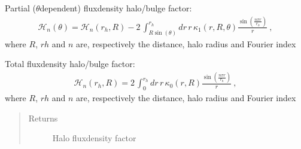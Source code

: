 \documentclass[letterpaper,10pt,english]{sphinxmanual}
\begin{document}

\begin{fulllineitems}
\label{\detokenize{diffsph.utils:diffsph.utils.tools.halo_fd}}
\sphinxAtStartPar
Partial (\(\theta\)\sphinxhyphen{}dependent) flux\sphinxhyphen{}density halo/bulge factor:
\begin{equation*}
\begin{split}\mathcal H_n(\theta) = \mathcal H_n(r_h,R) - 2\,\int_{R\sin(\theta)}^{r_h}dr\, r\, \kappa_1(r,R,\theta) \frac{\sin\left(\frac{n\pi r}{r_h}\right)}r \ ,\end{split}
\end{equation*}
\sphinxAtStartPar
where \(R\), \(rh\) and \(n\) are, respectively the distance, halo radius and Fourier index

\end{fulllineitems}


\begin{fulllineitems}
\label{\detokenize{diffsph.utils:diffsph.utils.tools.halo_fd_tot}}
\sphinxAtStartPar
Total flux\sphinxhyphen{}density halo/bulge factor:
\begin{equation*}
\begin{split}\mathcal H_n(r_h,R) = 2\,\int_0^{r_h}dr\, r\, \kappa_0(r,R) \frac{\sin\left(\frac{n\pi r}{r_h}\right)}r\ , \end{split}
\end{equation*}
\sphinxAtStartPar
where \(R\), \(rh\) and \(n\) are, respectively the distance, halo radius and Fourier index
\begin{quote}\begin{description}
\item[{Returns}] \leavevmode
\sphinxAtStartPar
Halo flux\sphinxhyphen{}density factor

\end{description}\end{quote}

\end{fulllineitems}
\end{document}
